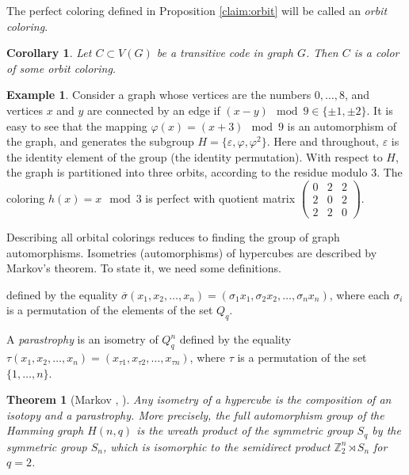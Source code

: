 \documentclass[11pt]{article}
\newtheorem{theorem}{Theorem}[section]
\newtheorem{corollary}{Corollary}[section]
\theoremstyle{definition}
\newtheorem{example}{Example}[section]
\begin{document}
{{{ The perfect coloring defined in Proposition \ref{claim:orbit}
will be called an {\sl orbit coloring}.}

\begin{corollary}
Let $C\subset V(G)$ be a transitive code in graph $G$. Then $C$
is a color of some orbit coloring.
\end{corollary}

{
\begin{example}\label{ex:circ}
Consider a graph whose vertices are the numbers $0,\dots,8$, and
vertices $x$ and $y$ are connected by an edge if $(x-y)\mod 9\in
\{\pm1,\pm2\}$. It is easy to see that the mapping
$\varphi(x)=(x+3)\mod 9$ is an automorphism of the graph, and generates the
subgroup
$H=\{\varepsilon,\varphi,\varphi^2\}$.  Here and throughout, $\varepsilon$ is the identity
element of the group (the identity permutation). With respect to $H$, the graph
is partitioned into three orbits, according to the residue modulo
$3$. The coloring $h(x)=x\mod 3$ is perfect with quotient matrix
 $\begin{pmatrix}
0 & 2 & 2 \\
2 & 0 & 2 \\
2 & 2 &0
\end{pmatrix}$.
\end{example}}

Describing all orbital colorings reduces to finding the group
of graph automorphisms. Isometries (automorphisms) of hypercubes are described by Markov's theorem. To state it, we need some
definitions.

defined by the equality
$\overline{\sigma}(x_1,x_2,\dots,x_n)=(\sigma_1x_1,\sigma_2x_2,\dots,\sigma_nx_n)$,
where each $\sigma_i$ is a permutation of the elements of the set $Q_q$.

A {\sl parastrophy} is an isometry of  $Q^n_q$ defined by
the equality
${\tau}(x_1,x_2,\dots,x_n)=(x_{\tau1},x_{\tau2},\dots,x_{\tau n})$,
where $\tau$ is a permutation of the set $\{1,\dots,n\}$.


\begin{theorem}[Markov \cite{Markov}, \cite{Miraf}]\label{Markov}
Any isometry of a hypercube is the composition of an isotopy and a
parastrophy. More precisely, the full automorphism group of the Hamming graph $H(n, q)$  is the wreath product of the symmetric group $S_{q}$ by the symmetric group $S_{n}$, which is isomorphic to the semidirect product ${\mathbb Z}_2^n\rtimes S_n$ for $q=2$.
\end{theorem}

}}
\end{document}
